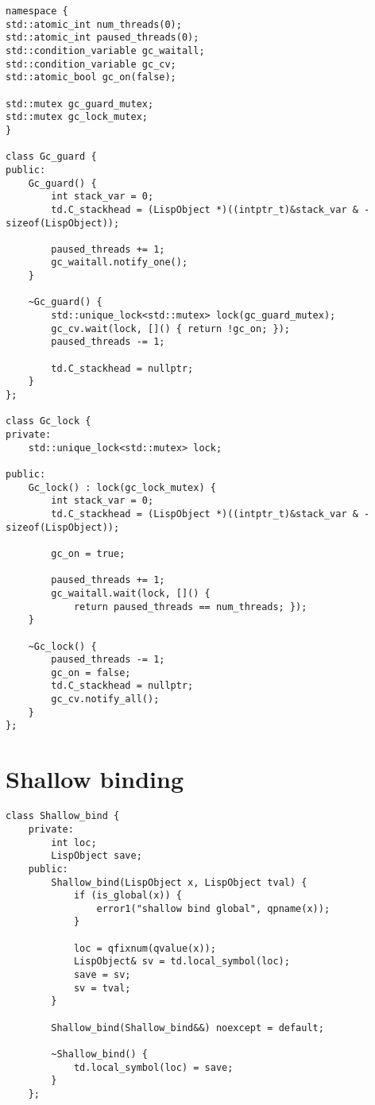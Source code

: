 \begin{verbatim}
namespace {
std::atomic_int num_threads(0);
std::atomic_int paused_threads(0);
std::condition_variable gc_waitall;
std::condition_variable gc_cv;
std::atomic_bool gc_on(false);

std::mutex gc_guard_mutex;
std::mutex gc_lock_mutex;
}

class Gc_guard {
public:
    Gc_guard() {
        int stack_var = 0;
        td.C_stackhead = (LispObject *)((intptr_t)&stack_var & -sizeof(LispObject));

        paused_threads += 1;
        gc_waitall.notify_one();
    }

    ~Gc_guard() {
        std::unique_lock<std::mutex> lock(gc_guard_mutex);
        gc_cv.wait(lock, []() { return !gc_on; });
        paused_threads -= 1;

        td.C_stackhead = nullptr;
    }
};

class Gc_lock {
private:
    std::unique_lock<std::mutex> lock;

public:
    Gc_lock() : lock(gc_lock_mutex) {
        int stack_var = 0;
        td.C_stackhead = (LispObject *)((intptr_t)&stack_var & -sizeof(LispObject));

        gc_on = true;

        paused_threads += 1;
        gc_waitall.wait(lock, []() {
            return paused_threads == num_threads; });
    }

    ~Gc_lock() {
        paused_threads -= 1;
        gc_on = false;
        td.C_stackhead = nullptr;
        gc_cv.notify_all();
    }
};
\end{verbatim}

\section{Shallow binding}
\label{sec:shallowbind-code}

\begin{verbatim}
class Shallow_bind {
    private:
        int loc;
        LispObject save;
    public:
        Shallow_bind(LispObject x, LispObject tval) {
            if (is_global(x)) {
                error1("shallow bind global", qpname(x));
            }

            loc = qfixnum(qvalue(x));
            LispObject& sv = td.local_symbol(loc);
            save = sv;
            sv = tval;
        }

        Shallow_bind(Shallow_bind&&) noexcept = default;

        ~Shallow_bind() {
            td.local_symbol(loc) = save;
        }
    };
\end{verbatim}

